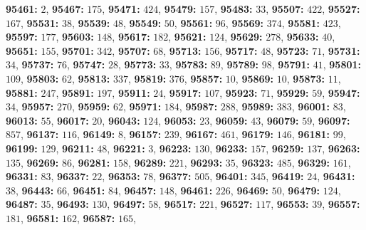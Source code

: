 \textsf{\bfseries 95461:} $2$, \textsf{\bfseries 95467:} $175$, \textsf{\bfseries 95471:} $424$, \textsf{\bfseries 95479:} $157$, \textsf{\bfseries 95483:} $33$, \textsf{\bfseries 95507:} $422$, \textsf{\bfseries 95527:} $167$, \textsf{\bfseries 95531:} $38$, \textsf{\bfseries 95539:} $48$, \textsf{\bfseries 95549:} $50$, \textsf{\bfseries 95561:} $96$, \textsf{\bfseries 95569:} $374$, \textsf{\bfseries 95581:} $423$, \textsf{\bfseries 95597:} $177$, \textsf{\bfseries 95603:} $148$, \textsf{\bfseries 95617:} $182$, \textsf{\bfseries 95621:} $124$, \textsf{\bfseries 95629:} $278$, \textsf{\bfseries 95633:} $40$, \textsf{\bfseries 95651:} $155$, \textsf{\bfseries 95701:} $342$, \textsf{\bfseries 95707:} $68$, \textsf{\bfseries 95713:} $156$, \textsf{\bfseries 95717:} $48$, \textsf{\bfseries 95723:} $71$, \textsf{\bfseries 95731:} $34$, \textsf{\bfseries 95737:} $76$, \textsf{\bfseries 95747:} $28$, \textsf{\bfseries 95773:} $33$, \textsf{\bfseries 95783:} $89$, \textsf{\bfseries 95789:} $98$, \textsf{\bfseries 95791:} $41$, \textsf{\bfseries 95801:} $109$, \textsf{\bfseries 95803:} $62$, \textsf{\bfseries 95813:} $337$, \textsf{\bfseries 95819:} $376$, \textsf{\bfseries 95857:} $10$, \textsf{\bfseries 95869:} $10$, \textsf{\bfseries 95873:} $11$, \textsf{\bfseries 95881:} $247$, \textsf{\bfseries 95891:} $197$, \textsf{\bfseries 95911:} $24$, \textsf{\bfseries 95917:} $107$, \textsf{\bfseries 95923:} $71$, \textsf{\bfseries 95929:} $59$, \textsf{\bfseries 95947:} $34$, \textsf{\bfseries 95957:} $270$, \textsf{\bfseries 95959:} $62$, \textsf{\bfseries 95971:} $184$, \textsf{\bfseries 95987:} $288$, \textsf{\bfseries 95989:} $383$, \textsf{\bfseries 96001:} $83$, \textsf{\bfseries 96013:} $55$, \textsf{\bfseries 96017:} $20$, \textsf{\bfseries 96043:} $124$, \textsf{\bfseries 96053:} $23$, \textsf{\bfseries 96059:} $43$, \textsf{\bfseries 96079:} $59$, \textsf{\bfseries 96097:} $857$, \textsf{\bfseries 96137:} $116$, \textsf{\bfseries 96149:} $8$, \textsf{\bfseries 96157:} $239$, \textsf{\bfseries 96167:} $461$, \textsf{\bfseries 96179:} $146$, \textsf{\bfseries 96181:} $99$, \textsf{\bfseries 96199:} $129$, \textsf{\bfseries 96211:} $48$, \textsf{\bfseries 96221:} $3$, \textsf{\bfseries 96223:} $130$, \textsf{\bfseries 96233:} $157$, \textsf{\bfseries 96259:} $137$, \textsf{\bfseries 96263:} $135$, \textsf{\bfseries 96269:} $86$, \textsf{\bfseries 96281:} $158$, \textsf{\bfseries 96289:} $221$, \textsf{\bfseries 96293:} $35$, \textsf{\bfseries 96323:} $485$, \textsf{\bfseries 96329:} $161$, \textsf{\bfseries 96331:} $83$, \textsf{\bfseries 96337:} $22$, \textsf{\bfseries 96353:} $78$, \textsf{\bfseries 96377:} $505$, \textsf{\bfseries 96401:} $345$, \textsf{\bfseries 96419:} $24$, \textsf{\bfseries 96431:} $38$, \textsf{\bfseries 96443:} $66$, \textsf{\bfseries 96451:} $84$, \textsf{\bfseries 96457:} $148$, \textsf{\bfseries 96461:} $226$, \textsf{\bfseries 96469:} $50$, \textsf{\bfseries 96479:} $124$, \textsf{\bfseries 96487:} $35$, \textsf{\bfseries 96493:} $130$, \textsf{\bfseries 96497:} $58$, \textsf{\bfseries 96517:} $221$, \textsf{\bfseries 96527:} $117$, \textsf{\bfseries 96553:} $39$, \textsf{\bfseries 96557:} $181$, \textsf{\bfseries 96581:} $162$, \textsf{\bfseries 96587:} $165$, 
